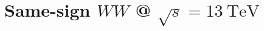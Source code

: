 \chapter[Same-sign $WW$ @ $\sqrt{s} = 13~\mathrm{TeV}$][Same-sign $WW$ @ $\sqrt{s} = 13~\mathrm{TeV}$]{Same-sign $WW$ @ $\sqrt{s} = 13~\mathrm{TeV}$}
\label{ch:ssww13tev}

